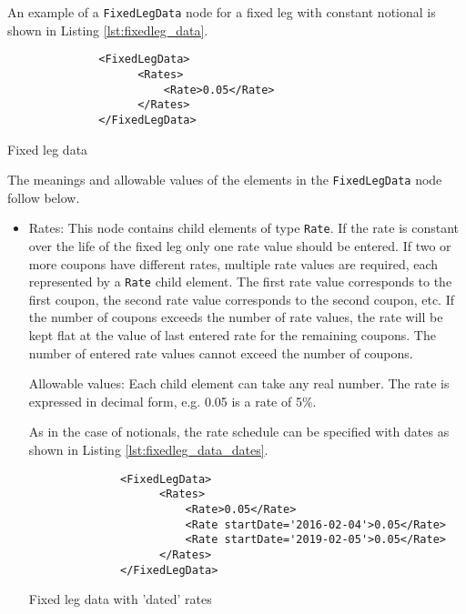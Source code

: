 An example of a \lstinline!FixedLegData! node for a fixed leg with constant notional is shown in Listing \ref{lst:fixedleg_data}.
\begin{listing}[H]
\begin{verbatim}
              <FixedLegData>
                    <Rates>
                        <Rate>0.05</Rate>
                    </Rates>
              </FixedLegData>
\end{verbatim}
\caption{Fixed leg data}
\label{lst:fixedleg_data}
\end{listing}

The meanings and allowable values of the elements in the \lstinline!FixedLegData! node follow below.

\begin{itemize}

\item Rates: This node contains child elements of type
  \lstinline!Rate!. If the rate is constant over the life of the fixed
  leg only one rate value should be entered. If two or more coupons
  have different rates, multiple rate values are required, each
  represented by a \lstinline!Rate! child element. The first rate
  value corresponds to the first coupon, the second rate value
  corresponds to the second coupon, etc. If the number of coupons
  exceeds the number of rate values, the rate will be kept flat at the
  value of last entered rate for the remaining coupons.  The number of
  entered rate values cannot exceed the number of coupons. 

  Allowable values: Each child element can take any  real number. The rate is
  expressed in decimal form, e.g. 0.05 is a rate of 5\%.

As in the case of notionals, the rate schedule can be specified with
dates as shown in Listing \ref{lst:fixedleg_data_dates}.
\begin{listing}[H]
\begin{verbatim}
              <FixedLegData>
                    <Rates>
                        <Rate>0.05</Rate>
                        <Rate startDate='2016-02-04'>0.05</Rate>
                        <Rate startDate='2019-02-05'>0.05</Rate>
                    </Rates>
              </FixedLegData>
\end{verbatim}
\caption{Fixed leg data with 'dated' rates}
\label{lst:fixedleg_data_dates}
\end{listing}

\end{itemize}

